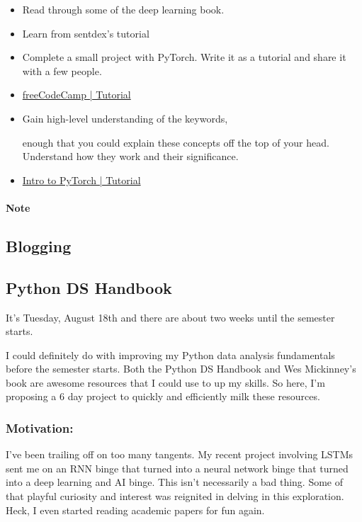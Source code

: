 \begin{itemize}
	\item
	Read through some of the deep learning book.

	\item
	Learn from sentdex's tutorial

	\item
	Complete a small project with PyTorch. Write it as a tutorial and share it with a few people.

	\item
	\href{https://youtu.be/GIsg-ZUy0MY}{freeCodeCamp | Tutorial}

	\item
	Gain high-level understanding of the keywords,

	enough that you could explain these concepts off the top of your head. Understand how they work and their significance.

	\item
	\href{https://youtu.be/pWrwyOsho5A}{Intro to PyTorch | Tutorial}
\end{itemize}

\paragraph*{Note}



\subsection{Blogging}



\subsection{Python DS Handbook}

It's Tuesday, August 18th and there are about two weeks until the semester starts.

I could definitely do with improving my Python data analysis fundamentals  before the semester starts. Both the Python DS Handbook and Wes Mickinney's book are awesome resources that I could use to up my skills. So here, I'm proposing a 6 day project to quickly and efficiently milk these resources.

\subsubsection*{Motivation:}
I've been trailing off on too many tangents. My recent project involving LSTMs sent me on an RNN binge that turned into a neural network binge that turned into a deep learning and AI binge. This isn't necessarily a bad thing. Some of that playful curiosity and interest was reignited in delving in this exploration. Heck, I even started reading academic papers for fun again.


